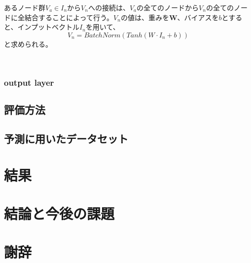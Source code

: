 \documentclass[a4paper,12pt]{jsreport}
\begin{document}
 あるノード群$V_a \in I_n$から$V_n$への接続は、$V_a$の全てのノードから$V_n$の全てのノードに全結合することによって行う。$V_n$の値は、重みを$\bm{W}$、バイアスを$b$とすると、インプットベクトル$I_n$を用いて、$$V_n = BatchNorm(Tanh(W \cdot I_n + b))$$と求められる。
  
 
  
  
  
  
  
 
  


 

　




\subsection{output layer}


\section{評価方法}
\section{予測に用いたデータセット}

\chapter{結果}

\chapter{結論と今後の課題}

\chapter{謝辞}
\end{document}
